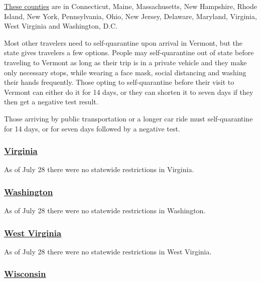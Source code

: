 \href{https://accd.vermont.gov/covid-19/restart/cross-state-travel}{These
counties} are in Connecticut, Maine, Massachusetts, New Hampshire, Rhode
Island, New York, Pennsylvania, Ohio, New Jersey, Delaware, Maryland,
Virginia, West Virginia and Washington, D.C.

Most other travelers need to self-quarantine upon arrival in Vermont,
but the state gives travelers a few options. People may self-quarantine
out of state before traveling to Vermont as long as their trip is in a
private vehicle and they make only necessary stops, while wearing a face
mask, social distancing and washing their hands frequently. Those opting
to self-quarantine before their visit to Vermont can either do it for 14
days, or they can shorten it to seven days if they then get a negative
test result.

Those arriving by public transportation or a longer car ride must
self-quarantine for 14 days, or for seven days followed by a negative
test.

\hypertarget{virginia}{%
\subsubsection{\texorpdfstring{\href{https://www.vdh.virginia.gov/coronavirus/frequently-asked-questions/u-s-travelers/}{Virginia}}{Virginia}}\label{virginia}}

As of July 28 there were no statewide restrictions in Virginia.

\hypertarget{washington}{%
\subsubsection{\texorpdfstring{\href{https://www.experiencewa.com/articles/date-coronavirus-travel-advisory}{Washington}}{Washington}}\label{washington}}

As of July 28 there were no statewide restrictions in Washington.

\hypertarget{west-virginia}{%
\subsubsection{\texorpdfstring{\href{https://wvtourism.com/travel-alert/}{West
Virginia}}{West Virginia}}\label{west-virginia}}

As of July 28 there were no statewide restrictions in West Virginia.

\hypertarget{wisconsin}{%
\subsubsection{\texorpdfstring{\href{https://www.dhs.wisconsin.gov/covid-19/travel.htm}{Wisconsin}}{Wisconsin}}\label{wisconsin}}

